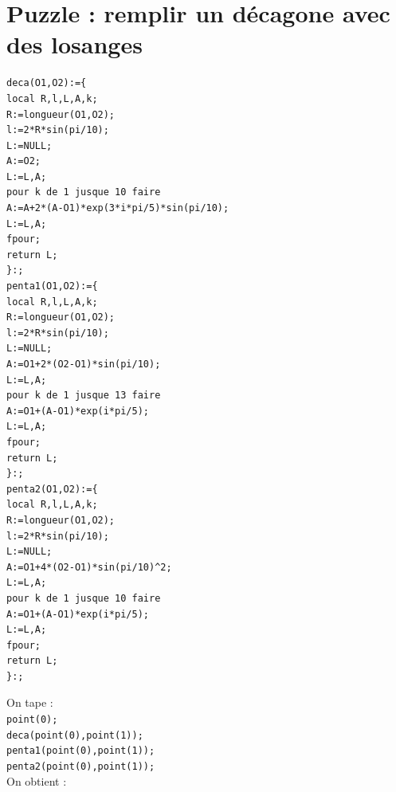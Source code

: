 \documentclass[a4paper,11pt]{book}
\begin{document}
\section{Puzzle : remplir un d\'ecagone avec des losanges}
\begin{verbatim}
deca(O1,O2):={
local R,l,L,A,k;
R:=longueur(O1,O2);
l:=2*R*sin(pi/10);
L:=NULL;
A:=O2;
L:=L,A;
pour k de 1 jusque 10 faire
A:=A+2*(A-O1)*exp(3*i*pi/5)*sin(pi/10);
L:=L,A;
fpour;
return L;
}:;
penta1(O1,O2):={
local R,l,L,A,k;
R:=longueur(O1,O2);
l:=2*R*sin(pi/10);
L:=NULL;
A:=O1+2*(O2-O1)*sin(pi/10);
L:=L,A;
pour k de 1 jusque 13 faire
A:=O1+(A-O1)*exp(i*pi/5);
L:=L,A;
fpour;
return L;
}:;
penta2(O1,O2):={
local R,l,L,A,k;
R:=longueur(O1,O2);
l:=2*R*sin(pi/10);
L:=NULL;
A:=O1+4*(O2-O1)*sin(pi/10)^2;
L:=L,A;
pour k de 1 jusque 10 faire
A:=O1+(A-O1)*exp(i*pi/5);
L:=L,A;
fpour;
return L;
}:;
\end{verbatim}
On tape :\\
{\tt point(0);}\\
{\tt deca(point(0),point(1));}\\
{\tt penta1(point(0),point(1));}\\
{\tt penta2(point(0),point(1));}\\
On obtient :\\
\end{document}
